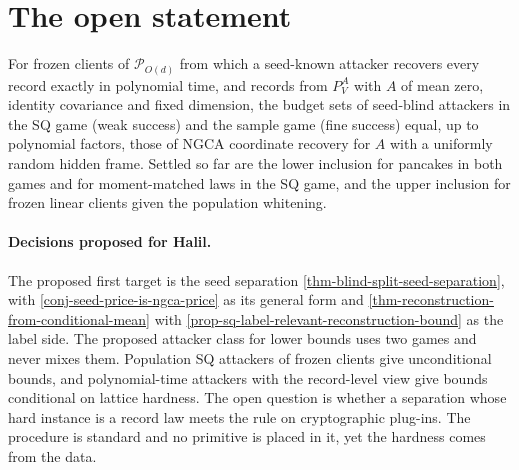 \section{The open statement}

\begin{conjecture}
For frozen clients of $\mathcal P_{O(d)}$ from which a seed-known attacker recovers
every record exactly in polynomial time, and records from $P^A_V$ with $A$ of mean
zero, identity covariance and fixed dimension, the budget sets of seed-blind
attackers in the SQ game (weak success) and the sample game (fine success) equal,
up to polynomial factors, those of NGCA coordinate recovery for $A$ with a uniformly
random hidden frame. Settled so far are the lower inclusion for pancakes in both games
and for moment-matched laws in the SQ game, and the upper inclusion for frozen
linear clients given the population whitening.
\end{conjecture}

\paragraph{Decisions proposed for Halil.} The proposed first target is the seed
separation \cref{thm-blind-split-seed-separation}, with \cref{conj-seed-price-is-ngca-price} as
its general form and \cref{thm-reconstruction-from-conditional-mean} with
\cref{prop-sq-label-relevant-reconstruction-bound} as the label side. The proposed
attacker class for lower bounds uses two games and never mixes them. Population SQ
attackers of frozen clients give unconditional bounds, and polynomial-time attackers
with the record-level view give bounds conditional on lattice hardness. The open question is whether a
separation whose hard instance is a record law meets the rule on cryptographic
plug-ins. The procedure is standard and no primitive is placed in it, yet the
hardness comes from the data.
